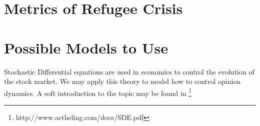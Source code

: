 \documentclass{article}
\begin{document}
\section{Metrics of Refugee Crisis}

\section{Possible Models to Use}

Stochastic Differential equations are used in economics to control the evolution of the stock market. We may apply this theory to model how to control opinion dynamics. A soft introduction to the topic may be found in \footnote{http://www.aetheling.com/docs/SDE.pdf}
\end{document}
